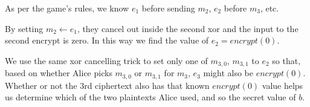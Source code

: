 \documentclass[11pt]{llncs}
\begin{document}
As per the game's rules, we know $e_1$ before sending $m_2$, $e_2$ before $m_3$, etc.

By setting $m_2 \gets e_1$, they cancel out inside the second xor and the input to the second encrypt is zero. In this way we find the value of $e_2 = encrypt(0)$.

We use the same xor cancelling trick to set only one of $m_{3,0}$, $m_{3,1}$ to $e_2$ so that, based on whether Alice picks $m_{3,0}$ or $m_{3,1}$ for $m_3$, $e_3$ might also be $encrypt(0)$. Whether or not the 3rd ciphertext also has that known $encrypt(0)$ value helps us determine which of the two plaintexts Alice used, and so the secret value of $b$.
\end{document}
